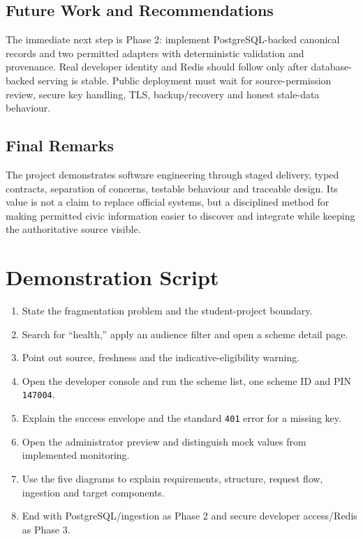 \documentclass{tietreport}
\begin{document}
\section{Future Work and Recommendations}
The immediate next step is Phase 2: implement PostgreSQL-backed canonical records and two
permitted adapters with deterministic validation and provenance. Real developer identity and
Redis should follow only after database-backed serving is stable. Public deployment must wait
for source-permission review, secure key handling, TLS, backup/recovery and honest stale-data
behaviour.

\section{Final Remarks}
The project demonstrates software engineering through staged delivery, typed contracts,
separation of concerns, testable behaviour and traceable design. Its value is not a claim to
replace official systems, but a disciplined method for making permitted civic information
easier to discover and integrate while keeping the authoritative source visible.

\appendix
\chapter{Demonstration Script}
\begin{enumerate}
  \item State the fragmentation problem and the student-project boundary.
  \item Search for ``health,'' apply an audience filter and open a scheme detail page.
  \item Point out source, freshness and the indicative-eligibility warning.
  \item Open the developer console and run the scheme list, one scheme ID and PIN \texttt{147004}.
  \item Explain the success envelope and the standard \texttt{401} error for a missing key.
  \item Open the administrator preview and distinguish mock values from implemented monitoring.
  \item Use the five diagrams to explain requirements, structure, request flow, ingestion and
        target components.
  \item End with PostgreSQL/ingestion as Phase 2 and secure developer access/Redis as Phase 3.
\end{enumerate}
\end{document}
